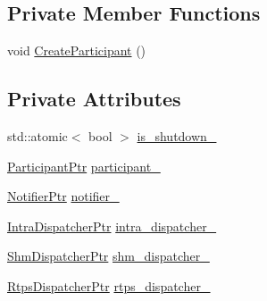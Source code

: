 \subsection*{Private Member Functions}
\begin{DoxyCompactItemize}
\item 
void \hyperlink{classapollo_1_1cyber_1_1transport_1_1Transport_a8587279f59fd40163a4b46842aad0fa0}{Create\-Participant} ()
\end{DoxyCompactItemize}
\subsection*{Private Attributes}
\begin{DoxyCompactItemize}
\item 
std\-::atomic$<$ bool $>$ \hyperlink{classapollo_1_1cyber_1_1transport_1_1Transport_aab6247d56f7301a97020294cd832429a}{is\-\_\-shutdown\-\_\-}
\item 
\hyperlink{namespaceapollo_1_1cyber_1_1transport_a4214d0780331276d0384d0b57e3bc688}{Participant\-Ptr} \hyperlink{classapollo_1_1cyber_1_1transport_1_1Transport_ad486ca0fb050e24358b278bf3f876828}{participant\-\_\-}
\item 
\hyperlink{namespaceapollo_1_1cyber_1_1transport_ad7de1bbf34457c17c4d04b9bbfe152b4}{Notifier\-Ptr} \hyperlink{classapollo_1_1cyber_1_1transport_1_1Transport_a4236e93d0039e1232f5df7f2fda36dfc}{notifier\-\_\-}
\item 
\hyperlink{namespaceapollo_1_1cyber_1_1transport_af059bf179d7ece8cb6ee52f0157568de}{Intra\-Dispatcher\-Ptr} \hyperlink{classapollo_1_1cyber_1_1transport_1_1Transport_ab4674c4a21310d94d764e7ce44f2ac0f}{intra\-\_\-dispatcher\-\_\-}
\item 
\hyperlink{namespaceapollo_1_1cyber_1_1transport_ad2181d36e971d8b74b322f8e2e3b36de}{Shm\-Dispatcher\-Ptr} \hyperlink{classapollo_1_1cyber_1_1transport_1_1Transport_a1000844ba1b39e20071ff12b2a13ed02}{shm\-\_\-dispatcher\-\_\-}
\item 
\hyperlink{namespaceapollo_1_1cyber_1_1transport_a52a5f048384d7613248f6b93957ca0be}{Rtps\-Dispatcher\-Ptr} \hyperlink{classapollo_1_1cyber_1_1transport_1_1Transport_a9415e50770db5e09cae7767c28e6836b}{rtps\-\_\-dispatcher\-\_\-}
\end{DoxyCompactItemize}


